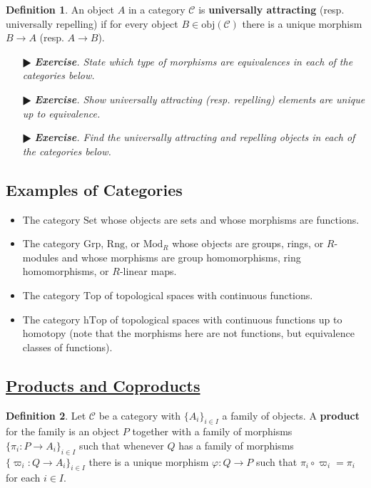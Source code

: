 \documentclass[11pt]{amsart}
\theoremstyle{definition}
\newtheorem*{definition*}{Definition}
\renewcommand\:{\colon}
\newcommand{\calC}{\mathcal{C}}
\newcommand{\1}{\mathds{1}}
\newcommand{\Grp}{\text{Grp}}
\newcommand{\hTop}{\text{hTop}}
\newcommand{\Mod}{\text{Mod}}
\newcommand{\obj}{\text{obj}}
\newcommand{\Rng}{\text{Rng}}
\newcommand{\Set}{\text{Set}}
\newcommand{\Top}{\text{Top}}
\newcommand{\exc}[1]{\vspace{-2.5pt}\begin{itemize}[leftmargin=15pt]\item[$\RHD$] \textit{\textbf{Exercise}. #1}\end{itemize}}
\begin{document}
\begin{definition*}
	An object $A$ in a category $\calC$ is \textbf{universally attracting} (resp. universally repelling) if for every object $B \in \obj(\calC)$ there is a unique morphism $B \to A$ (resp. $A \to B$).
\end{definition*}

\exc{State which type of morphisms are equivalences in each of the categories below.}
\exc{Show universally attracting (resp. repelling) elements are unique up to equivalence.}
\exc{Find the universally attracting and repelling objects in each of the categories below.}
\vskip10pt

\subsection*{Examples of Categories}
\vspace{-5pt}\begin{itemize}[leftmargin=*]\setlength\itemsep{0em}
	\item The category $\Set$ whose objects are sets and whose morphisms are functions.
	\item The category $\Grp$, $\Rng$, or $\Mod_R$ whose objects are groups, rings, or $R$-modules and whose morphisms are group homomorphisms, ring homomorphisms, or $R$-linear maps.
	\item The category $\Top$ of topological spaces with continuous functions.
	\item The category $\hTop$ of topological spaces with continuous functions up to homotopy (note that the morphisms here are not functions, but equivalence classes of functions).
\end{itemize}

\clearpage %

\subsection*{\underline{Products and Coproducts}}

\begin{definition*}
	Let $\calC$ be a category with $\{A_i\}_{i \in I}$ a family of objects. A \textbf{product} for the family is an object $P$ together with a family of morphisms $\{\pi_i\: P \to A_i\}_{i\in I}$ such that whenever $Q$ has a family of morphisms $\{\varpi_i\: Q \to A_i\}_{i \in I}$ there is a unique morphism $\varphi\: Q \to P$ such that $\pi_i \circ \varpi_i = \pi_i$ for each $i \in I$.
\end{definition*}
\end{document}
